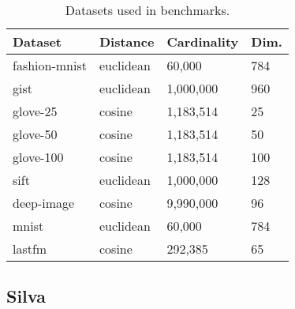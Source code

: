 \begin{table}[!t]
    \caption{Datasets used in benchmarks.}
    \label{table:datasets:summary}
    \vskip 0.15in
    \begin{center}
        \begin{small}
            \begin{sc}
                \begin{tabular}{|l|l|l|l|}
                    \hline
                    \textbf{Dataset} & \textbf{Distance}  &\textbf{Cardinality}  & \textbf{Dim.}  \\
                    \hline
                    fashion-mnist    & euclidean              & 60,000             & 784       \\
                    \hline 
                    gist             & euclidean              & 1,000,000          & 960       \\
                    \hline
                    glove-25         & cosine              & 1,183,514          & 25        \\
                    \hline
                    glove-50         & cosine              & 1,183,514          & 50        \\
                    \hline
                    glove-100        & cosine              & 1,183,514          & 100       \\
                    \hline
                    sift             & euclidean              & 1,000,000          & 128       \\
                    \hline
                    deep-image       & cosine              & 9,990,000          & 96        \\
                    \hline
                    mnist            & euclidean              & 60,000             & 784       \\
                    \hline
                    lastfm           & cosine              & 292,385            & 65        \\
                    \hline
                \end{tabular}
            \end{sc}
        \end{small}
    \end{center}
    \vskip -0.1in
\end{table}


\subsection{Silva}
\label{subsec:silva}

